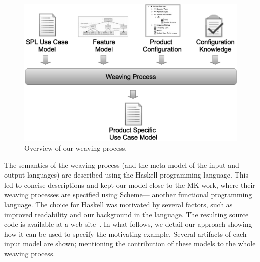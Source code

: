 \documentclass{sig-alternate}
\begin{document}
\begin{figure}[htb]
 \begin{center}
  \includegraphics[scale=0.30]{img/weave-process2.eps}
  \caption{Overview of our weaving process.}
  \label{fig:weave-process}
  \end{center}
\end{figure}

\newpage

The semantics of the weaving process (and the
meta-model of the input and output languages) are described using the Haskell
programming language. This led to concise descriptions and kept our model close
to the MK work, where their weaving processes are specified using Scheme---
another functional programming language. The choice for Haskell was motivated by
several factors, such as improved readability and our background in the language.
The resulting source code is available at a web site~\cite{SPG:site}. In what follows, we detail our approach showing
how it can be used to specify the motivating example. Several artifacts of each
input model are shown; mentioning the contribution of these models to the whole
weaving process.

\end{document}
